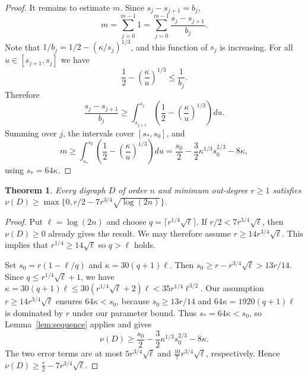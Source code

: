\documentclass[10pt,a4paper]{article}
\newtheorem{theorem}{Theorem}[section]
\numberwithin{equation}{section}
\newcommand{\jbjcomment}[1]{\textcolor{blue}{JBJ: #1}}
\begin{document}
\begin{proof}
It remains to estimate $m$. Since $s_j-s_{j+1}=b_j$,
$$
m=\sum_{j=0}^{m-1}1=\sum_{j=0}^{m-1}\frac{s_j-s_{j+1}}{b_j}.
$$
Note that $1/b_j=1/2-(\kappa/s_j)^{1/3}$, and this function of $s_j$ is
increasing. %
For all $u\in [s_{j+1},s_j]$ we have 
$$
\frac12-\left(\frac{\kappa}{u}\right)^{1/3}\le\frac1{b_j}.
$$
Therefore
$$
\frac{s_j-s_{j+1}}{b_j}
\ge\int_{s_{j+1}}^{s_j}\left(\frac12-\left(\frac{\kappa}{u}\right)^{1/3}\right)du.
$$
Summing over $j$, the intervals cover $[s_\ast,s_0]$, and
$$
m\ge\int_{s_\ast}^{s_0}\left(\frac12-\left(\frac{\kappa}{u}\right)^{1/3}\right)du
=\frac{s_0}{2}-\frac32\kappa^{1/3}s_0^{2/3}-8\kappa,
$$
using $s_\ast=64\kappa$.
\end{proof}


\begin{theorem}\label{thm:local}
Every digraph $D$ of order $n$ and minimum out-degree $r\ge1$
satisfies
$\nu(D)\ge\max\{0,r/2-7r^{3/4}\sqrt{\log(2n)}\}$.
\end{theorem}

\begin{proof}
Put $\ell=\log(2n)$ and choose $q=\lceil r^{1/4}\sqrt\ell\rceil$.
If $r/2<7r^{3/4}\sqrt\ell$, then $\nu(D)\ge0$ already gives the result.
We may therefore assume $r\ge14r^{3/4}\sqrt\ell$. This implies that $r^{1/4}\geq 14\sqrt{\ell}$ so $q>\ell$ holds.


Set $s_0=r(1-\ell/q)$ and $\kappa=30(q+1)\ell$. Then
$s_0\ge r-r^{3/4}\sqrt\ell>13r/14$.
Since $q\le r^{1/4}\sqrt{\ell}+1$, we have
$\kappa=30(q+1)\ell \le 30(r^{1/4}\sqrt{\ell}+2)\ell<35r^{1/4}\ell^{3/2}$.
Our assumption $r\ge14r^{3/4}\sqrt{\ell}$ ensures $64\kappa<s_0$, because $s_0\ge 13r/14$ and $64\kappa=1920(q+1)\ell$ is dominated by $r$ under our parameter bound.
Thus $s_\ast=64\kappa<s_0$, so Lemma~\ref{lem:sequence} applies and
gives
$$
\nu(D)\ge\frac{s_0}{2}-\frac32\kappa^{1/3}s_0^{2/3}-8\kappa.
$$
The two error terms are at most   $5r^{3/4}\sqrt\ell$ and 
$\frac{10}{7}r^{3/4}\sqrt\ell$, 
respectively. Hence
$
\nu(D)\ge\frac r2-7r^{3/4}\sqrt\ell$.
\end{proof}




\end{document}
